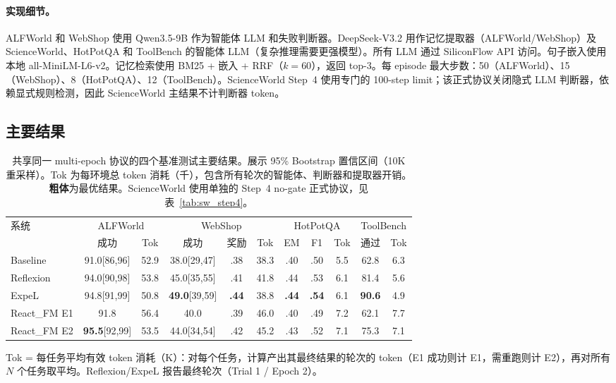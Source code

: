 \documentclass[11pt,a4paper]{article}
\newcommand{\method}{React\_FM}
\begin{document}
\paragraph{实现细节。} ALFWorld 和 WebShop 使用 Qwen3.5-9B 作为智能体 LLM 和失败判断器。DeepSeek-V3.2 用作记忆提取器（ALFWorld/WebShop）及 ScienceWorld、HotPotQA 和 ToolBench 的智能体 LLM（复杂推理需要更强模型）。所有 LLM 通过 SiliconFlow API 访问。句子嵌入使用本地 all-MiniLM-L6-v2。记忆检索使用 BM25 + 嵌入 + RRF（$k{=}60$），返回 top-3。每 episode 最大步数：50（ALFWorld）、15（WebShop）、8（HotPotQA）、12（ToolBench）。ScienceWorld Step~4 使用专门的 100-step limit；该正式协议关闭隐式 LLM 判断器，依赖显式规则检测，因此 ScienceWorld 主结果不计判断器 token。

\subsection{主要结果}

\begin{table}[t]
\centering
\caption{共享同一 multi-epoch 协议的四个基准测试主要结果。展示 95\% Bootstrap 置信区间（10K 重采样）。Tok 为每环境总 token 消耗（千），包含所有轮次的智能体、判断器和提取器开销。\textbf{粗体}为最优结果。ScienceWorld 使用单独的 Step~4 no-gate 正式协议，见表~\ref{tab:sw_step4}。}
\label{tab:main_results}
\scriptsize
\setlength{\tabcolsep}{1.6pt}
\begin{tabular}{l cc ccc ccc cc}
\toprule
\multirow{2}{*}{系统} & \multicolumn{2}{c}{ALFWorld} & \multicolumn{3}{c}{WebShop} & \multicolumn{3}{c}{HotPotQA} & \multicolumn{2}{c}{ToolBench} \\
\cmidrule(lr){2-3} \cmidrule(lr){4-6} \cmidrule(lr){7-9} \cmidrule(lr){10-11}
 & 成功 & Tok & 成功 & 奖励 & Tok & EM & F1 & Tok & 通过 & Tok \\
\midrule
Baseline & 91.0\tiny{[86,96]} & 52.9 & 38.0\tiny{[29,47]} & .38 & 38.3 & .40 & .50 & 5.5 & 62.8 & 6.3 \\
Reflexion & 94.0\tiny{[90,98]} & 53.8 & 45.0\tiny{[35,55]} & .41 & 41.8 & .44 & .53 & 6.1 & 81.4 & 5.6 \\
ExpeL & 94.8\tiny{[91,99]} & 50.8 & \textbf{49.0}\tiny{[39,59]} & \textbf{.44} & 38.8 & \textbf{.44} & \textbf{.54} & 6.1 & \textbf{90.6} & 4.9 \\
\midrule
\method{} E1 & 91.8 & 56.4 & 40.0 & .39 & 46.0 & .40 & .49 & 7.2 & 62.1 & 7.7 \\
\method{} E2 & \textbf{95.5}\tiny{[92,99]} & 53.5 & 44.0\tiny{[34,54]} & .42 & 45.2 & .43 & .52 & 7.1 & 75.3 & 7.1 \\
\bottomrule
\end{tabular}
\vspace{0.3em}

{\footnotesize Tok = 每任务平均有效 token 消耗（K）：对每个任务，计算产出其最终结果的轮次的 token（E1 成功则计 E1，需重跑则计 E2），再对所有 $N$ 个任务取平均。Reflexion/ExpeL 报告最终轮次（Trial 1 / Epoch 2）。}
\end{table}
\end{document}
